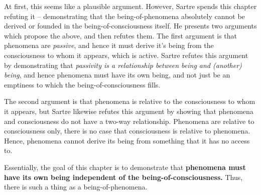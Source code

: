 At first, this seems like a plausible argument. However, Sartre spends this chapter refuting it -- demonstrating that the being-of-phenomena absolutely cannot be derived or founded in the being-of-consciousness itself. He presents two arguments which propose the above, and then refutes them. The first argument is that phenomena are \emph{passive}, and hence it must derive it's being from the consciousness to whom it appears, which is active. Sartre refutes this argument by demonstrating that \emph{passivity is a relationship between being and (another) being}, and hence phenomena must have its own being, and not just be an emptiness to which the being-of-consciousness fills.

The second argument is that phenomena is relative to the consciousness to whom it appears, but Sartre likewise refutes this argument by showing that phenomena and consciousness do not have a two-way relationship. Phenomena are relative to consciousness only, there is no case that consciousness is relative to phenomena. Hence, phenomena cannot derive its being from something that it has no access to.

Essentially, the goal of this chapter is to demonstrate that \textbf{phenomena must have its own being independent of the being-of-consciousness.} Thus, there is such a thing as a being-of-phenomena.

